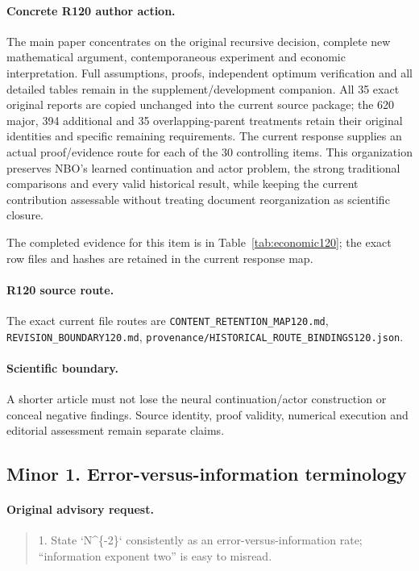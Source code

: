 \paragraph{Concrete R120 author action.}
The main paper concentrates on the original recursive decision, complete new mathematical argument, contemporaneous experiment and economic interpretation. Full assumptions, proofs, independent optimum verification and all detailed tables remain in the supplement/development companion. All 35 exact original reports are copied unchanged into the current source package; the 620 major, 394 additional and 35 overlapping-parent treatments retain their original identities and specific remaining requirements. The current response supplies an actual proof/evidence route for each of the 30 controlling items. This organization preserves NBO's learned continuation and actor problem, the strong traditional comparisons and every valid historical result, while keeping the current contribution assessable without treating document reorganization as scientific closure.

The completed evidence for this item is in Table~\ref{tab:economic120}; the exact row files and hashes are retained in the current response map.
\paragraph{R120 source route.}
The exact current file routes are \nolinkurl{CONTENT_RETENTION_MAP120.md}, \nolinkurl{REVISION_BOUNDARY120.md}, \nolinkurl{provenance/HISTORICAL_ROUTE_BINDINGS120.json}.
\paragraph{Scientific boundary.}
A shorter article must not lose the neural continuation/actor construction or conceal negative findings. Source identity, proof validity, numerical execution and editorial assessment remain separate claims.

\subsection{Minor 1. Error-versus-information terminology}
\label{response120:minor-1}
\paragraph{Original advisory request.}
\begin{quote}
1. State `N\textasciicircum{}\{-2\}` consistently as an error-versus-information rate; “information exponent two” is easy to misread.
\end{quote}
